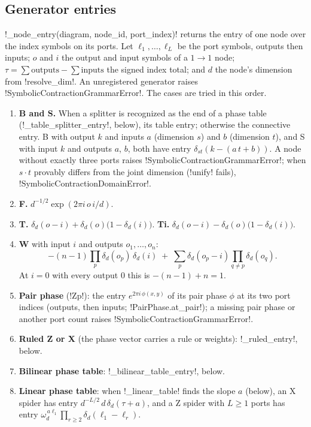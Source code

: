 \subsection{Generator entries}\label{sec:semantics-symbolic-entries}

\py!_node_entry(diagram, node_id, port_index)! returns the entry of one node over the index symbols on its ports. Let $\ell_1,\dots,\ell_L$ be the port symbols, outputs then inputs; $o$ and $i$ the output and input symbols of a $1\to1$ node; $\tau=\sum\text{outputs}-\sum\text{inputs}$ the signed index total; and $d$ the node's dimension from \py!resolve_dim!. An unregistered generator raises \py!SymbolicContractionGrammarError!. The cases are tried in this order.

\begin{enumerate}
\item \textbf{B and S.} When a splitter is recognized as the end of a phase table (\py!_table_splitter_entry!, below), its table entry; otherwise the connective entry. B with output $k$ and inputs $a$ (dimension $s$) and $b$ (dimension $t$), and S with input $k$ and outputs $a$, $b$, both have entry $\delta_{st}(k-(a\,t+b))$. A node without exactly three ports raises \py!SymbolicContractionGrammarError!; when $s\cdot t$ provably differs from the joint dimension (\py!unify! fails), \py!SymbolicContractionDomainError!.
\item \textbf{F.} $d^{-1/2}\exp(2\pi i\,o\,i/d)$.
\item \textbf{T.} $\delta_d(o-i)+\delta_d(o)\bigl(1-\delta_d(i)\bigr)$. \textbf{Ti.} $\delta_d(o-i)-\delta_d(o)\bigl(1-\delta_d(i)\bigr)$.
\item \textbf{W} with input $i$ and outputs $o_1,\dots,o_n$:
\[
-(n-1)\prod_{p}\delta_d(o_p)\,\delta_d(i)\;+\;\sum_{p}\delta_d(o_p-i)\prod_{q\ne p}\delta_d(o_q).
\]
At $i=0$ with every output 0 this is $-(n-1)+n=1$.
\item \textbf{Pair phase} (\code!Zp!): the entry $e^{2\pi i\,\phi(x,y)}$ of its pair phase $\phi$ at its two port indices (outputs, then inputs; \py!PairPhase.at_pair!); a missing pair phase or another port count raises \py!SymbolicContractionGrammarError!.
\item \textbf{Ruled Z or X} (the phase vector carries a rule or weights): \py!_ruled_entry!, below.
\item \textbf{Bilinear phase table}: \py!_bilinear_table_entry!, below.
\item \textbf{Linear phase table}: when \py!_linear_table! finds the slope $a$ (below), an X spider has entry $d^{-L/2}\,d\,\delta_d(\tau+a)$, and a Z spider with $L\ge1$ ports has entry $\omega_d^{\,a\ell_1}\prod_{r\ge2}\delta_d(\ell_1-\ell_r)$.

\end{enumerate}

